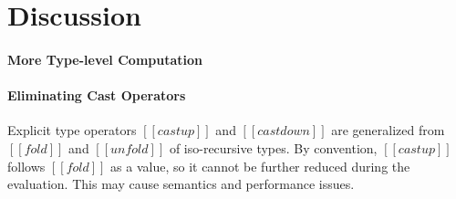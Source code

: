 \newcommand{\framedhslinecorrect}[2]%
  {#1[#2]}

\newcommand{\framedhs}{\sethscode{framedhscode}}


\newenvironment{inlinehscode}%
  {\(\def\column##1##2{}%
   \let\>\undefined\let\<\undefined\let\\\undefined
   \newcommand\>[1][]{}\newcommand\<[1][]{}\newcommand\\[1][]{}%
   \def\fromto##1##2##3{##3}%
   \def\nextline{}}{\) }%

\newcommand{\inlinehs}{\sethscode{inlinehscode}}


\newenvironment{joincode}%
  {\let\orighscode=\hscode
   \let\origendhscode=\endhscode
   \def\endhscode{\def\hscode{\endgroup\def\@currenvir{hscode}\\}\begingroup}
   \orighscode\def\hscode{\endgroup\def\@currenvir{hscode}}}%
  {\origendhscode
   \global\let\hscode=\orighscode
   \global\let\endhscode=\origendhscode}%

\makeatother
\EndFmtInput
%

\section{Discussion}
\label{sec:discuss}

\paragraph{More Type-level Computation}

\paragraph{Eliminating Cast Operators}

Explicit type \cast operators $[[castup]]$ and $[[castdown]]$ are
generalized from $[[fold]]$ and $[[unfold]]$ of iso-recursive
types. By convention, $[[castup]]$ follows $[[fold]]$ as a value, so
it cannot be further reduced during the evaluation. This may cause
semantics and performance issues.

